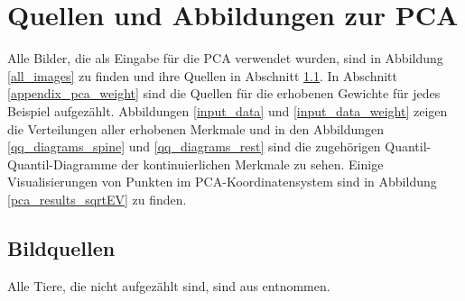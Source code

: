 \chapter{Quellen und Abbildungen zur PCA}
\label{appendix_pca}

Alle Bilder, die als Eingabe für die PCA verwendet wurden, sind in Abbildung \ref{all_images} zu finden und ihre Quellen in Abschnitt \ref{picture_sources}. In Abschnitt \ref{appendix_pca_weight} sind die Quellen für die erhobenen Gewichte für jedes Beispiel aufgezählt. 
Abbildungen \ref{input_data} und \ref{input_data_weight} zeigen die Verteilungen aller erhobenen Merkmale und in den Abbildungen \ref{qq_diagrams_spine} und  \ref{qq_diagrams_rest} sind die zugehörigen Quantil-Quantil-Diagramme der kontinuierlichen Merkmale zu sehen.
Einige Visualisierungen von Punkten im PCA-Koordinatensystem sind in Abbildung \ref{pca_results_sqrtEV} zu finden.

\section{Bildquellen}
\label{picture_sources}
 
 Alle Tiere, die nicht aufgezählt sind, sind aus \cite{Spezielle_Zoologie} entnommen.
 
